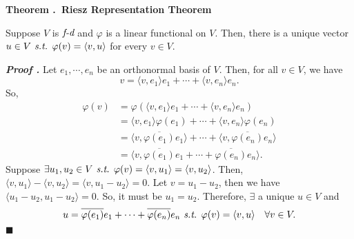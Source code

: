 \documentclass[11pt, letterpaper]{article}
\newcounter{index}[subsection]
\newenvironment*{thm}[1]{\begin{tcolorbox}\par\noindent\textbf{Theorem \thesubsection.\stepcounter{index}\theindex\ #1} \par}{\par\end{tcolorbox}}
\newcounter{nprf}[subsection]
\newenvironment*{prf}{\par\indent\textbf{\textit{Proof \stepcounter{nprf}\thenprf.}}}{\hfill$\blacksquare$\par}
\def\phi{\varphi}
\def\st{\emph{ s.t. }}
\def\FD{\emph{f-d}}
\begin{document}
\begin{thm}{Riesz Representation Theorem}
	Suppose $V$ is $\FD$ and $\phi$ is a linear functional on $V$. Then, there is a unique vector $u\in V\st \phi(v)=\langle v,u\rangle$ for every $v\in V$.	
\end{thm}
\begin{prf}
	Let $e_1,\cdots,e_n$ be an orthonormal basis of $V$. Then, for all $v\in V$, we have \[v=\langle v,e_1\rangle e_1+\cdots+\langle v,e_n\rangle e_n.\] So, \[\begin{aligned}\phi(v)&=\phi(\langle v,e_1\rangle e_1+\cdots+\langle v,e_n\rangle e_n)\\&=\langle v,e_1\rangle\phi(e_1)+\cdots+\langle v,e_n\rangle\phi(e_n)\\&=\langle v,\overline{\phi(e_1)}e_1\rangle+\cdots+\langle v,\overline{\phi(e_n)}e_n\rangle\\&=\langle v,\overline{\phi(e_1)}e_1+\cdots+\overline{\phi(e_n)}e_n\rangle.\end{aligned}\] Suppose $\exists u_1,u_2\in V\st\phi(v)=\langle v,u_1\rangle=\langle v,u_2\rangle$. Then, $\langle v,u_1\rangle-\langle v,u_2\rangle=\langle v,u_1-u_2\rangle=0$. Let $v=u_1-u_2$, then we have $\langle u_1-u_2,u_1-u_2\rangle=0$. So, it must be $u_1=u_2$. Therefore, $\exists$ a unique $u\in V$ and \[u=\overline{\phi(e_1)}e_1+\cdots+\overline{\phi(e_n)}e_n\st\phi(v)=\langle v,u\rangle\quad\forall v\in V.\]
\end{prf}
\end{document}
